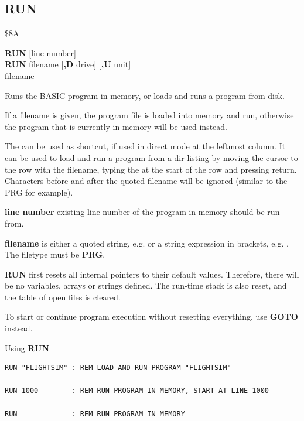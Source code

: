 \subsection{RUN}
\begin{description}[leftmargin=2cm,style=nextline]
\item [Token:]    \$8A

\item [Format:]   {\bf RUN} [line number] \\
                  {\bf RUN} filename [{\bf,D} drive] [{\bf,U} unit] \\
                  \megakeywhite{$\uparrow$} filename

\item [Usage:]    Runs the BASIC program in memory, or loads and runs a program from disk.

                  If a filename is given, the program file is loaded into memory and run, otherwise the program that is currently in memory will be used instead.

                  The {\bf \screentext{$\uparrow$}} can be used as shortcut, if used in direct mode at the leftmost column. It can be used to load and run a program from a dir listing by moving the cursor to the row with the filename, typing the {\bf \screentext{$\uparrow$}} at the start of the row and pressing return. Characters before and after the quoted filename will be ignored (similar to the PRG for example).

                  {\bf line number} existing line number of the program in memory should be run from.

                  {\bf filename} is either a quoted string, e.g.  or a string expression in brackets, e.g. . The filetype must be {\bf PRG}.

                  \drivedefinition

                  \unitdefinition

\item [Remarks:]  {\bf RUN} first resets all internal pointers to their default values. Therefore, there will be no variables, arrays or strings defined. The run-time stack is also reset, and the table of open files is cleared.

                  To start or continue program execution without resetting everything, use {\bf GOTO} instead.

\item [Examples:] Using {\bf RUN}

\begin{tcolorbox}[colback=black,coltext=white]
\verbatimfont{\codefont}
\begin{verbatim}
RUN "FLIGHTSIM" : REM LOAD AND RUN PROGRAM "FLIGHTSIM"

RUN 1000        : REM RUN PROGRAM IN MEMORY, START AT LINE 1000

RUN             : REM RUN PROGRAM IN MEMORY
\end{verbatim}
\end{tcolorbox}
\end{description}

